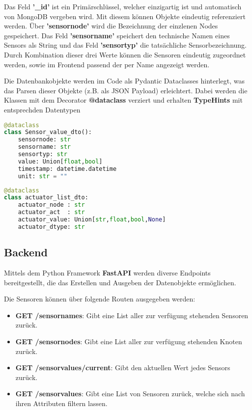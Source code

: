 Das Feld \textbf{'\_id'} ist ein Primärschlüssel, welcher einzigartig ist und automatisch von MongoDB vergeben wird. 
Mit diesem können Objekte eindeutig referenziert werden.
Über \textbf{'sensornode'} wird die Bezeichnung der einzlenen Nodes gespeichert.
Das Feld \textbf{'sensorname'} speichert den technische Namen eines Sensors als String und das Feld \textbf{'sensortyp'} die tatsächliche Sensorbezeichnung. 
Durch Kombination dieser drei Werte können die Sensoren eindeutig zugeordnet werden, sowie im Frontend passend der per Name angezeigt werden.

Die Datenbankobjekte werden im Code als Pydantic Dataclasses hinterlegt, was das Parsen dieser Objekte (z.B. als JSON Payload) erleichtert. 
Dabei werden die Klassen mit dem Decorator \textbf{@dataclass} verziert und erhalten \textbf{TypeHints} mit entsprechden Datentypen

\begin{lstlisting}[language=python,caption={Sensor Dataclass},captionpos=b,showstringspaces=false, basicstyle=\small,label={lst:dataclass}]
@dataclass
class Sensor_value_dto():
    sensornode: str
    sensorname: str
    sensortyp: str
    value: Union[float,bool]
    timestamp: datetime.datetime
    unit: str = ""
\end{lstlisting}

\begin{lstlisting}[language=python,caption={Actuator Dataclass},captionpos=b,showstringspaces=false, basicstyle=\small,label={lst:dataclass}]
@dataclass
class actuator_list_dto:
    actuator_node : str
    actuator_act  : str
    actuator_value: Union[str,float,bool,None]
    actuator_dtype: str
\end{lstlisting}

\subsection{Backend}
Mittels dem Python Framework \textbf{FastAPI} werden diverse Endpoints bereitgestellt, die das Erstellen und Ausgeben der Datenobjekte ermöglichen.

Die Sensoren können über folgende Routen ausgegeben werden:
\begin{itemize}
\item \textbf{GET /sensornames}: Gibt eine List aller zur verfügung stehenden Sensoren zurück.
\item \textbf{GET /sensornodes}: Gibt eine List aller zur verfügung stehenden Knoten zurück.
\item \textbf{GET /sensorvalues/current}: Gibt den aktuellen Wert jedes Sensors zurück.
\item \textbf{GET /sensorvalues}: Gibt eine List von Sensoren zurück, welche sich nach ihren Attributen filtern lassen.
\end{itemize}

